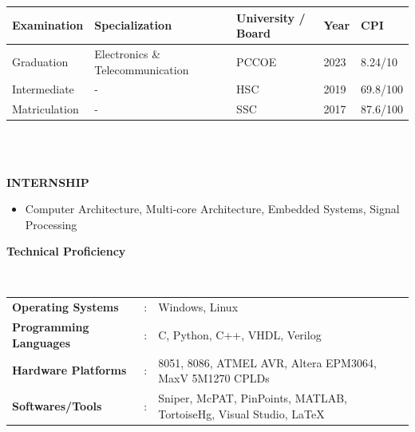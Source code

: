 \documentclass[a4paper,10pt]{article}
\begin{document}
\vspace{-.8cm}

\begin{tabularx}{.98\textwidth}{llp{2cm}lll}
  \hline
  \textbf{Examination} & \textbf{Specialization}          &  & \textbf{University / Board} & \textbf{Year} & \textbf{CPI} \\
  \hline
  Graduation           & Electronics \& Telecommunication &  & PCCOE                       & 2023          & 8.24/10      \\
  Intermediate         & -                                &  & HSC                         & 2019          & 69.8/100     \\
  Matriculation        & -                                &  & SSC                         & 2017          & 87.6/100     \\
  \hline
\end{tabularx}
\\\\


\colorbox{titleColor}{\parbox{6.7in}{\textbf{INTERNSHIP}}}
\begin{itemize}
  \setlength{\itemsep}{1pt}
  \item {{Computer Architecture, Multi-core Architecture, Embedded Systems, Signal Processing}}
\end{itemize}

\colorbox{titleColor}{\parbox{6.7in}{\textbf{Technical Proficiency}}}\\

\begin{tabular}{p{1.6in}p{0.1in}p{4.5in}}
  \textbf{\small{Operating Systems}}     & : & {{Windows, Linux}}                                                      \\
  \textbf{\small{Programming Languages}} & : & {{C, Python, C++, VHDL, Verilog}}                                       \\
  \textbf{\small{Hardware Platforms}}    & : & {{8051, 8086, ATMEL AVR, Altera EPM3064, MaxV 5M1270 CPLDs}}            \\
  \textbf{\small{Softwares/Tools}}       & : & {{Sniper, McPAT, PinPoints, MATLAB, TortoiseHg, Visual Studio, \LaTeX}} \\
\end{tabular}
\end{document}
